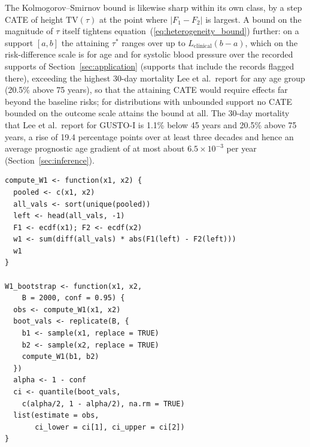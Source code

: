 \documentclass[AMA,Times1COL]{WileyNJDv5}
\begin{document}
The Kolmogorov--Smirnov bound is likewise sharp within its own class, by a step CATE of height $\mathrm{TV}(\tau)$ at the point where $|F_1 - F_2|$ is largest. A bound on the magnitude of $\tau$ itself tightens equation~(\ref{eq:heterogeneity_bound}) further: on a support $[a, b]$ the attaining $\tau^*$ ranges over up to $L_{\text{clinical}} (b - a)$, which on the risk-difference scale is  for age and  for systolic blood pressure over the recorded supports of Section~\ref{sec:application} (supports that include the records flagged there), exceeding the highest 30-day mortality Lee et al.\ report for any age group (20.5\% above 75 years\cite{lee1995}), so that the attaining CATE would require effects far beyond the baseline risks; for distributions with unbounded support no CATE bounded on the outcome scale attains the bound at all. The 30-day mortality that Lee et al.\ report for GUSTO-I is 1.1\% below 45 years and 20.5\% above 75 years,\cite{lee1995} a rise of 19.4 percentage points over at least three decades and hence an average prognostic age gradient of at most about $6.5 \times 10^{-3}$ per year (Section~\ref{sec:inference}).


\begin{lstlisting}[caption={R function for computing the Wasserstein-1 distance with bootstrap confidence intervals.},label=lst:nabcd,basicstyle=\fontsize{8}{10}\selectfont\ttfamily]
compute_W1 <- function(x1, x2) {
  pooled <- c(x1, x2)
  all_vals <- sort(unique(pooled))
  left <- head(all_vals, -1)
  F1 <- ecdf(x1); F2 <- ecdf(x2)
  w1 <- sum(diff(all_vals) * abs(F1(left) - F2(left)))
  w1
}

W1_bootstrap <- function(x1, x2,
    B = 2000, conf = 0.95) {
  obs <- compute_W1(x1, x2)
  boot_vals <- replicate(B, {
    b1 <- sample(x1, replace = TRUE)
    b2 <- sample(x2, replace = TRUE)
    compute_W1(b1, b2)
  })
  alpha <- 1 - conf
  ci <- quantile(boot_vals,
    c(alpha/2, 1 - alpha/2), na.rm = TRUE)
  list(estimate = obs,
       ci_lower = ci[1], ci_upper = ci[2])
}
\end{lstlisting}
\end{document}
